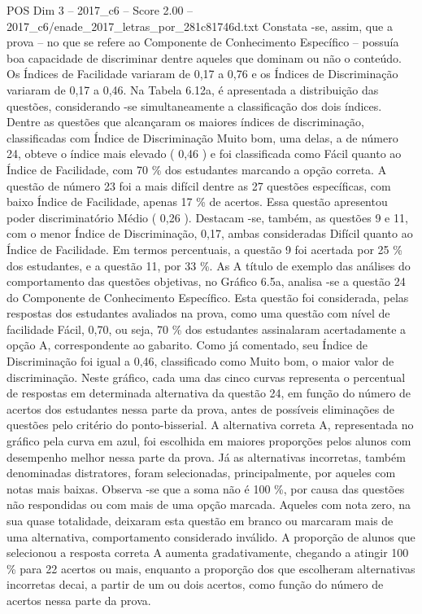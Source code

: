 \begin{textsample}{POS Dim 3 – 2017\_c6 – Score 2.00 – 2017\_c6/enade\_2017\_letras\_por\_281c81746d.txt}
Constata -se, assim, que a prova – no que se refere ao Componente de Conhecimento Específico – possuía boa capacidade de discriminar dentre aqueles que dominam ou não o conteúdo.
Os Índices de Facilidade variaram de 0,17 a 0,76 e os Índices de Discriminação variaram de 0,17 a 0,46.
Na Tabela 6.12a, é apresentada a distribuição das questões, considerando -se simultaneamente a classificação dos dois índices.
Dentre as questões que alcançaram os maiores índices de discriminação, classificadas com Índice de Discriminação Muito bom, uma delas, a de número 24, obteve o índice mais elevado ( 0,46 ) e foi classificada como Fácil quanto ao Índice de Facilidade, com 70 \% dos estudantes marcando a opção correta.
A questão de número 23 foi a mais difícil dentre as 27 questões específicas, com baixo Índice de Facilidade, apenas 17 \% de acertos.
Essa questão apresentou poder discriminatório Médio ( 0,26 ).
Destacam -se, também, as questões 9 e 11, com o menor Índice de Discriminação, 0,17, ambas consideradas Difícil quanto ao Índice de Facilidade.
Em termos percentuais, a questão 9 foi acertada por 25 \% dos estudantes, e a questão 11, por 33 \%.
As A título de exemplo das análises do comportamento das questões objetivas, no Gráfico 6.5a, analisa -se a questão 24 do Componente de Conhecimento Específico.
Esta questão foi considerada, pelas respostas dos estudantes avaliados na prova, como uma questão com nível de facilidade Fácil, 0,70, ou seja, 70 \% dos estudantes assinalaram acertadamente a opção A, correspondente ao gabarito.
Como já comentado, seu Índice de Discriminação foi igual a 0,46, classificado como Muito bom, o maior valor de discriminação.
Neste gráfico, cada uma das cinco curvas representa o percentual de respostas em determinada alternativa da questão 24, em função do número de acertos dos estudantes nessa parte da prova, antes de possíveis eliminações de questões pelo critério do ponto-bisserial.
A alternativa correta A, representada no gráfico pela curva em azul, foi escolhida em maiores proporções pelos alunos com desempenho melhor nessa parte da prova.
Já as alternativas incorretas, também denominadas distratores, foram selecionadas, principalmente, por aqueles com notas mais baixas.
Observa -se que a soma não é 100 \%, por causa das questões não respondidas ou com mais de uma opção marcada.
Aqueles com nota zero, na sua quase totalidade, deixaram esta questão em branco ou marcaram mais de uma alternativa, comportamento considerado inválido.
A proporção de alunos que selecionou a resposta correta A aumenta gradativamente, chegando a atingir 100 \% para 22 acertos ou mais, enquanto a proporção dos que escolheram alternativas incorretas decai, a partir de um ou dois acertos, como função do número de acertos nessa parte da prova.

\end{textsample}
